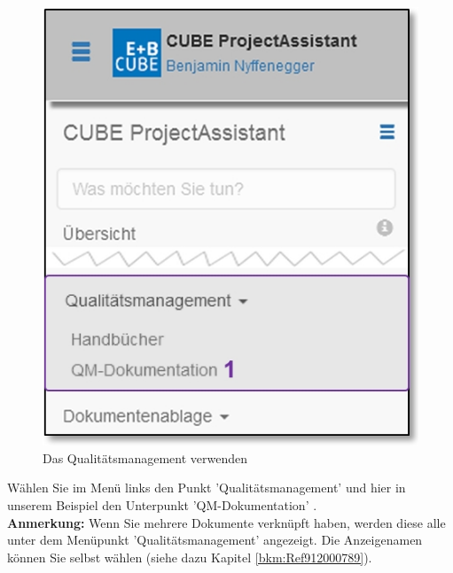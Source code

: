 \begin{figure}   %
  \vspace{-35pt}      %
  \begin{center}
    \includegraphics[width=1\linewidth]{../chapters/09_Qualitaetsmanagement/pictures/9-1_Menu_Qualitaetsmanagement.jpg}
  \end{center}
  \vspace{-20pt}
  \caption{Das Qualitätsmanagement verwenden}
  \vspace{-10pt}
\end{figure}

Wählen Sie im Menü links den Punkt 'Qualitätsmanagement' und hier in unserem Beispiel den Unterpunkt 'QM-Dokumentation' . \\
 
\textbf{Anmerkung:} Wenn Sie mehrere Dokumente verknüpft haben, werden diese alle unter dem Menüpunkt 'Qualitätsmanagement' angezeigt. Die Anzeigenamen können Sie selbst wählen (siehe dazu Kapitel \ref{bkm:Ref912000789}). \\

